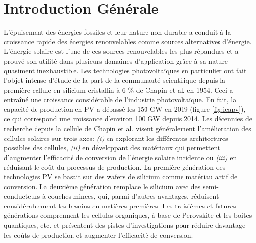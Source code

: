 \chapter*{Introduction Générale}
\label{sec:intro}
L’épuisement des énergies fossiles et leur nature non-durable a conduit à la croissance rapide des énergies renouvelables comme sources alternatives d'énergie. L’énergie solaire est l’une de ces sources renouvelables les plus répandues et a prouvé son utilité dans plusieurs domaines d'application grâce à sa nature quasiment inexhaustible. Les technologies photovoltaïques en particulier ont fait l'objet intense d'étude de la part de la communauté scientifique depuis la première cellule en silicium cristallin à 6 \% de Chapin et al. \cite{Chapin1954} en 1954. Ceci a entraîné une croissance considérable de l'industrie photovoltaïque. En fait, la capacité de production en PV a dépassé les 150 GW \cite{iea2020} en 2019 (figure \ref{fig:ieapv}), ce qui correspond une croissance d'environ 100 GW depuis 2014. Les décennies de recherche depuis la cellule de Chapin et al. visent généralement l'amélioration des cellules solaires sur trois axes: \textit{(i)} en explorant les différentes architectures possibles des cellules, \textit{(ii)} en développant des matériaux qui permettent d'augmenter l'efficacité de conversion de l'énergie solaire incidente ou \textit{(iii)} en réduisant le coût du processus de production. La première génération des technologies PV se basait sur des wafers de silicium comme matériau actif de conversion. La deuxième génération remplace le silicium avec des semi-conducteurs à couches minces, qui, parmi d'autres avantages, réduisent considérablement les besoins en matières premières. Les troisièmes et futures générations comprennent les cellules organiques, à base de Perovskite et les boites quantiques, etc. et présentent des pistes d'investigations pour réduire davantage les coûts de production et augmenter l'efficacité de conversion.

